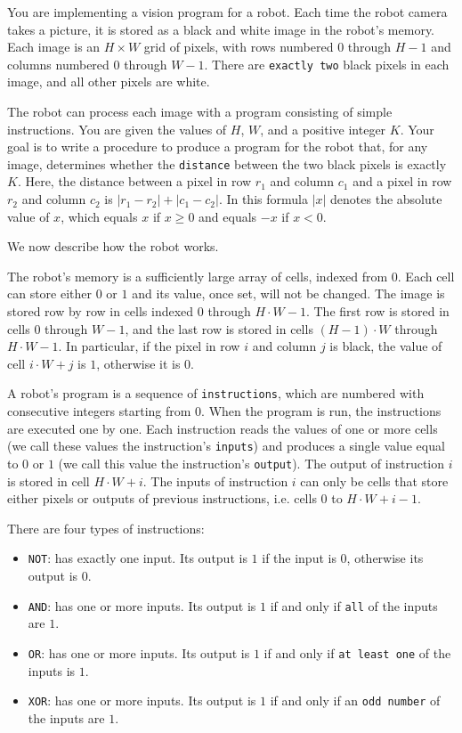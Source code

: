 You are implementing a vision program for a robot.
Each time the robot camera takes a picture, it is stored as a black and white image in the robot's memory.
Each image is an $H \times W$ grid of pixels, with rows numbered $0$ through $H-1$ and columns numbered $0$ through $W-1$.
There are \texttt{exactly two} black pixels in each image, and all other pixels are white.

The robot can process each image with a program consisting of simple instructions.
You are given the values of $H$, $W$, and a positive integer $K$.
Your goal is to write a procedure to produce a program for the robot that, for any image, determines whether the \texttt{distance} between the two black pixels is exactly $K$.
Here, the distance between a pixel in row $r_1$ and column $c_1$ and a pixel in row $r_2$ and column $c_2$ is $|r_1-r_2|+|c_1-c_2|$.
In this formula $|x|$ denotes the absolute value of $x$, which equals $x$ if $x \geq 0$ and equals $-x$ if $x < 0$.

We now describe how the robot works.

The robot's memory is a sufficiently large array of cells, indexed from $0$.
Each cell can store either $0$ or $1$ and its value, once set, will not be changed.
The image is stored row by row in cells indexed $0$ through $H \cdot W - 1$.
The first row is stored in cells $0$ through $W-1$, and the last row is stored in cells $(H - 1) \cdot W$ through $H \cdot W - 1$.
In particular, if the pixel in row $i$ and column $j$ is black, the value of cell $i \cdot W + j$ is $1$, otherwise it is $0$.

A robot's program is a sequence of \texttt{instructions}, which are numbered with consecutive integers starting from $0$.
When the program is run, the instructions are executed one by one.
Each instruction reads the values of one or more cells (we call these values the instruction's \texttt{inputs}) and produces a single value equal to $0$ or $1$ (we call this value the instruction's \texttt{output}).
The output of instruction $i$ is stored in cell $H \cdot W + i$.
The inputs of instruction $i$ can only be cells that store either pixels or outputs of previous instructions, i.e. cells $0$ to $H \cdot W + i - 1$.

There are four types of instructions:
\begin{itemize}
\item \texttt{NOT}: has exactly one input. Its output is $1$ if the input is $0$, otherwise its output is $0$.
\item \texttt{AND}: has one or more inputs. Its output is $1$ if and only if \texttt{all} of the inputs are $1$.
\item \texttt{OR}: has one or more inputs. Its output is $1$ if and only if \texttt{at least one} of the inputs is $1$.
\item \texttt{XOR}: has one or more inputs. Its output is $1$ if and only if an \texttt{odd number} of the inputs are $1$.
\end{itemize}

